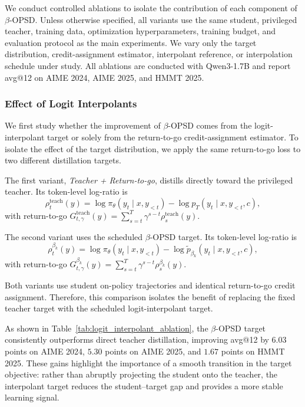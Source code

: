 We conduct controlled ablations to isolate the contribution of each component of
$\beta$-OPSD. Unless otherwise specified, all variants use the same student, privileged
teacher, training data, optimization hyperparameters, training budget, and evaluation
protocol as the main experiments. We vary only the target distribution, credit-assignment
estimator, interpolant reference, or interpolation schedule under study. All ablations are
conducted with Qwen3-1.7B and report avg@12 on AIME 2024, AIME 2025, and HMMT 2025.

\subsubsection{Effect of Logit Interpolants}
\label{sec:ablation_logit_interpolants}

We first study whether the improvement of $\beta$-OPSD comes from the logit-interpolant
target or solely from the return-to-go credit-assignment estimator. To isolate the effect of
the target distribution, we apply the same return-to-go loss to two different distillation
targets.

The first variant, \emph{Teacher + Return-to-go}, distills directly toward the privileged
teacher. Its token-level log-ratio is
\begin{equation}
    \rho_t^{\mathrm{teach}}(y)
    =
    \log \pi_\theta(y_t\mid x,y_{<t})
    -
    \log p_T(y_t\mid x,y_{<t},c),
\end{equation}
with return-to-go $G_{t,\gamma}^{\mathrm{teach}}(y)=\sum_{s=t}^{T}\gamma^{s-t}\rho_s^{\mathrm{teach}}(y).$

The second variant uses the scheduled $\beta$-OPSD target. Its token-level log-ratio is 
\begin{equation}
    \rho_t^{\beta_k}(y)
    =
    \log \pi_\theta(y_t\mid x,y_{<t})
    -
    \log \tilde p_{\beta_k}(y_t\mid x,y_{<t},c),
\end{equation}
with return-to-go $G_{t,\gamma}^{\beta_k}(y)=\sum_{s=t}^{T}\gamma^{s-t}\rho_s^{\beta_k}(y).$

Both variants use student on-policy trajectories and identical return-to-go credit
assignment. Therefore, this comparison isolates the benefit of replacing the fixed teacher
target with the scheduled logit-interpolant target.

As shown in Table~\ref{tab:logit_interpolant_ablation}, the $\beta$-OPSD target
consistently outperforms direct teacher distillation, improving avg@12 by $6.03$ points on
AIME 2024, $5.30$ points on AIME 2025, and $1.67$ points on HMMT 2025. These gains
highlight the importance of a smooth transition in the target objective: rather than abruptly
projecting the student onto the teacher, the interpolant target reduces the student--target
gap and provides a more stable learning signal.

